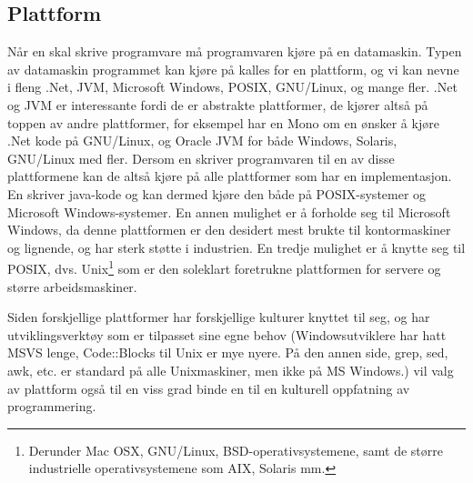 \documentclass[11pt]{article}
\begin{document}
\subsection{Plattform}
Når en skal skrive programvare må programvaren kjøre på en datamaskin. Typen av datamaskin programmet kan kjøre på kalles for en plattform, og vi kan nevne i fleng .Net, JVM, Microsoft Windows, POSIX, GNU/Linux, og mange fler.
.Net og JVM er interessante fordi de er abstrakte plattformer, de kjører altså på toppen av andre plattformer, for eksempel har en Mono om en ønsker å kjøre .Net kode på GNU/Linux, og Oracle JVM for både Windows, Solaris, GNU/Linux med fler.
Dersom en skriver programvaren til en av disse plattformene kan de altså kjøre på alle plattformer som har en implementasjon. En skriver java-kode og kan dermed kjøre den både på POSIX-systemer og Microsoft Windows-systemer.
En annen mulighet er å forholde seg til Microsoft Windows, da denne plattformen er den desidert mest brukte til kontormaskiner og lignende, og har sterk støtte i industrien.
En tredje mulighet er å knytte seg til POSIX, dvs. Unix\footnote{Derunder Mac OSX, GNU/Linux, BSD-operativsystemene, samt de større industrielle operativsystemene som AIX, Solaris mm.} som er den soleklart foretrukne plattformen for servere og større arbeidsmaskiner.

Siden forskjellige plattformer har forskjellige kulturer knyttet til seg, og har utviklingsverktøy som er tilpasset sine egne behov (Windowsutviklere har hatt MSVS lenge, Code::Blocks til Unix er mye nyere. På den annen side, grep, sed, awk, etc. er standard på alle Unixmaskiner, men ikke på MS Windows.) vil valg av plattform også til en viss grad binde en til en kulturell oppfatning av programmering.
\end{document}
